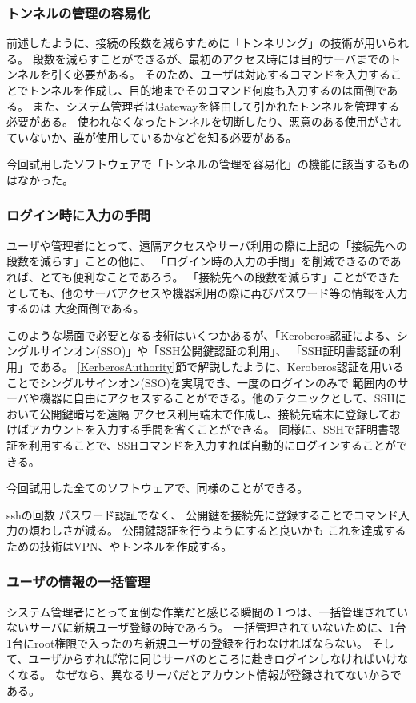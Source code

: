 \documentclass[11pt,a4j,titlepage]{jreport}
\begin{document}
\subsubsection*{トンネルの管理の容易化}
前述したように、接続の段数を減らすために「トンネリング」の技術が用いられる。
段数を減らすことができるが、最初のアクセス時には目的サーバまでのトンネルを引く必要がある。
そのため、ユーザは対応するコマンドを入力することでトンネルを作成し、目的地までそのコマンド何度も入力するのは面倒である。
また、システム管理者はGatewayを経由して引かれたトンネルを管理する必要がある。
使われなくなったトンネルを切断したり、悪意のある使用がされていないか、誰が使用しているかなどを知る必要がある。

今回試用したソフトウェアで「トンネルの管理を容易化」の機能に該当するものはなかった。


\subsubsection*{ログイン時に入力の手間}
ユーザや管理者にとって、遠隔アクセスやサーバ利用の際に上記の「接続先への段数を減らす」ことの他に、
「ログイン時の入力の手間」を削減できるのであれば、とても便利なことであろう。
「接続先への段数を減らす」ことができたとしても、他のサーバアクセスや機器利用の際に再びパスワード等の情報を入力するのは
大変面倒である。

このような場面で必要となる技術はいくつかあるが、「Keroberos認証による、シングルサインオン(SSO)」や「SSH公開鍵認証の利用」、
「SSH証明書認証の利用」である。
\ref{KerberosAuthority}節で解説したように、Keroberos認証を用いることでシングルサインオン(SSO)を実現でき、一度のログインのみで
範囲内のサーバや機器に自由にアクセスすることができる。他のテクニックとして、SSHにおいて公開鍵暗号を遠隔
アクセス利用端末で作成し、接続先端末に登録しておけばアカウントを入力する手間を省くことができる。
同様に、SSHで証明書認証を利用することで、SSHコマンドを入力すれば自動的にログインすることができる。
\par 今回試用した全てのソフトウェアで、同様のことができる。

sshの回数
パスワード認証でなく、
公開鍵を接続先に登録することでコマンド入力の煩わしさが減る。
公開鍵認証を行うようにすると良いかも
これを達成するための技術はVPN、やトンネルを作成する。
\fi

\subsubsection{ユーザの情報の一括管理}
システム管理者にとって面倒な作業だと感じる瞬間の１つは、一括管理されていないサーバに新規ユーザ登録の時であろう。
一括管理されていないために、1台1台にroot権限で入ったのち新規ユーザの登録を行わなければならない。
そして、ユーザからすれば常に同じサーバのところに赴きログインしなければいけなくなる。
なぜなら、異なるサーバだとアカウント情報が登録されてないからである。
\end{document}
